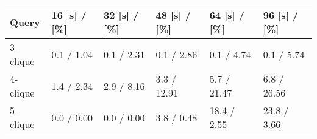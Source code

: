 \begin{tabular}{llllll}
\toprule
    Query & 16 [s] / [\%] & 32 [s] / [\%] & 48 [s] / [\%] & 64 [s] / [\%] & 96 [s] / [\%] \\
\midrule
 3-clique &   0.1 / 1.04 &   0.1 / 2.31 &   0.1 / 2.86 &   0.1 / 4.74 &   0.1 / 5.74 \\
 4-clique &   1.4 / 2.34 &   2.9 / 8.16 &  3.3 / 12.91 &  5.7 / 21.47 &  6.8 / 26.56 \\
 5-clique &   0.0 / 0.00 &   0.0 / 0.00 &   3.8 / 0.48 &  18.4 / 2.55 &  23.8 / 3.66 \\
\bottomrule
\end{tabular}
